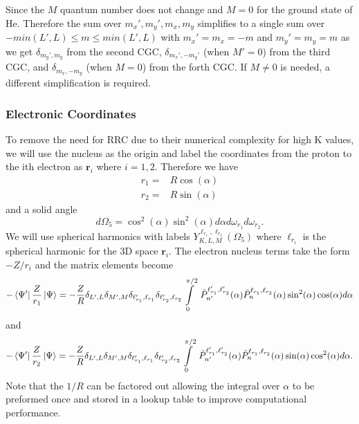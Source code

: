 Since the $M$ quantum number does not change and $M=0$ for the ground state of He. Therefore the sum over $m_x',m_y',m_x,m_y$ simplifies to a single sum over $-min(L',L)\le m \le min(L',L)$ with $m_x'=m_x=-m$ and $m_y'=m_y=m$ as we get $\delta_{m_y',m_y}$ from the second CGC, $\delta_{m_x',-m_y'}$ (when $M'=0$) from the third CGC, and $\delta_{m_x,-m_y}$ (when $M=0$) from the forth CGC. If $M\ne0$ is needed, a different simplification is required.


\subsubsection{Electronic Coordinates} %
\label{ssub:electronic_coordinates}
To remove the need for RRC due to their numerical complexity for high K values, we will use the nucleus as the origin and label the coordinates from the proton to the ith electron as $\mathbf{r}_i$ where $i=1,2$. Therefore we have
\begin{align}
r_1 =& R \cos(\alpha)\\
r_2 =& R \sin(\alpha)
\end{align}
and a solid angle 
\begin{equation}
  d\Omega_5 = \cos^2(\alpha)  \sin^2(\alpha) d\alpha d\omega_{r_1} d\omega_{r_2}.
\end{equation}
We will use spherical harmonics with labels $Y_{K,L,M}^{\ell_{r_1},\ell_{r_2}}(\Omega_5)$ where $\ell_{r_i}$ is the spherical harmonic for the 3D space $\mathbf{r}_i$. The electron nucleus terms take the form $-Z/r_i$ and the  matrix elements become
\begin{equation}
  -\bra{\Psi'}\frac{Z}{r_1}\ket{\Psi} = -\frac{Z}{R}\delta_{L',L}\delta_{M',M}\delta_{\ell_{r_1}',\ell_{r_1}}\delta_{\ell_{r_2}',\ell_{r_2}} \int\limits_0^{\pi/2}\ \tilde{P}^{\ell_{r_1}',\ell_{r_2}'}_{n'}(\alpha) \tilde{P}^{\ell_{r_1},\ell_{r_2}}_{n}(\alpha) \sin^2(\alpha) \cos(\alpha)d\alpha
\end{equation}
and 
\begin{equation}
  -\bra{\Psi'}\frac{Z}{r_2}\ket{\Psi} = -\frac{Z}{R}\delta_{L',L}\delta_{M',M}\delta_{\ell_{r_1}',\ell_{r_1}}\delta_{\ell_{r_2}',\ell_{r_2}} \int\limits_0^{\pi/2}\ \tilde{P}^{\ell_{r_1}',\ell_{r_2}'}_{n'}(\alpha) \tilde{P}^{\ell_{r_1},\ell_{r_2}}_{n}(\alpha) \sin(\alpha) \cos^2(\alpha)d\alpha.
\end{equation}
Note that the $1/R$ can be factored out allowing the integral over $\alpha$ to be preformed once and stored in a lookup table to improve computational performance.

